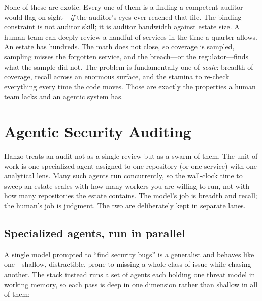 \documentclass[11pt,letterpaper]{article}
\begin{document}
None of these are exotic. Every one of them is a finding a competent auditor would
flag on sight---\emph{if} the auditor's eyes ever reached that file. The binding
constraint is not auditor skill; it is auditor bandwidth against estate size. A
human team can deeply review a handful of services in the time a quarter allows.
An estate has hundreds. The math does not close, so coverage is sampled, sampling
misses the forgotten service, and the breach---or the regulator---finds what the
sample did not. The problem is fundamentally one of \emph{scale}: breadth of
coverage, recall across an enormous surface, and the stamina to re-check
everything every time the code moves. Those are exactly the properties a human
team lacks and an agentic system has.

\section{Agentic Security Auditing}

Hanzo treats an audit not as a single review but as a swarm of them. The unit of
work is one specialized agent assigned to one repository (or one service) with one
analytical lens. Many such agents run concurrently, so the wall-clock time to
sweep an estate scales with how many workers you are willing to run, not with how
many repositories the estate contains. The model's job is breadth and recall; the
human's job is judgment. The two are deliberately kept in separate lanes.

\subsection{Specialized agents, run in parallel}

A single model prompted to ``find security bugs'' is a generalist and behaves like
one---shallow, distractible, prone to missing a whole class of issue while
chasing another. The stack instead runs a set of agents each holding one threat
model in working memory, so each pass is deep in one dimension rather than shallow
in all of them:
\end{document}
